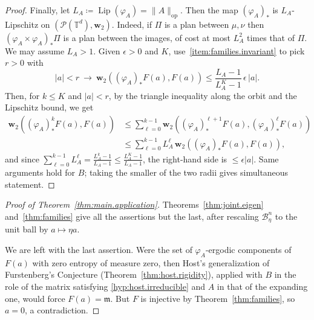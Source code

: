 \documentclass[11pt,reqno]{amsart}
\theoremstyle{plain}
\theoremstyle{definition}
\newcommand{\dw}{\mathbf{w}_2}
\newcommand{\T}{\mathbb{T}}
\newcommand{\Leb}{\mathfrak{m}}
\newcommand{\lto}{\longrightarrow}
\newcommand{\Prob}{\mathcal{P}}
\DeclareMathOperator{\Lip}{Lip}
\begin{document}
\begin{proof}
    Finally, let \( L_A\coloneqq \Lip( \varphi_A )=\lVert A \rVert_{\mathrm{op}} \).
    Then the map \( ( \varphi_A )_\ast  \) is \( L_A \)-Lipschitz on \( (\Prob(\T^d),\dw) \).
    Indeed, if \( \Pi \) is a plan between \( \mu,\nu \) then \( ( \varphi_A \times  \varphi_A )_\ast \Pi \) is a plan between the images, of cost at most \( L_A^2 \) times that of \( \Pi \).
    We may assume \( L_A>1 \).
    Given \( \epsilon>0 \) and \( K \), use~\ref{item:families.invariant} to pick \( r>0 \) with
    \[
        \lvert a \rvert<r\ \lto \
        \dw\left(( \varphi_A )_\ast F(a),F(a)\right)\le\frac{L_A-1}{L_A^{K}-1}\,\epsilon\,\lvert a \rvert .
    \]
    Then, for \( k\le K \) and \( \lvert a \rvert<r \), by the triangle inequality along the orbit and the Lipschitz bound, we get
    \[
        \begin{split}
            \dw\left(( \varphi_A )^k_\ast F(a),F(a)\right) & \le\sum_{\ell=0}^{k-1}\dw\left(( \varphi_A )^{\ell+1}_\ast F(a),( \varphi_A )^{\ell}_\ast F(a)\right) \\
                                                        & \le\sum_{\ell=0}^{k-1}L_A^{\ell}\,\dw\left(( \varphi_A )_\ast F(a),F(a)\right),
        \end{split}
    \]
    and since \(\sum_{\ell=0}^{k-1}L_A^{\ell}=\frac{L_A^{k}-1}{L_A-1} \le\frac{L_A^{K}-1}{L_A-1}\), the right-hand side is \( \le\epsilon\lvert a \rvert \).
    Same arguments hold for \( B \); taking the smaller of the two radii gives simultaneous statement.
\end{proof}

\begin{proof}[Proof of Theorem~\ref{thm:main.application}]
    Theorems~\ref{thm:joint.eigen} and~\ref{thm:families} give all the assertions but the last, after rescaling \(\mathcal B^n_\eta\) to the unit ball by \(a\mapsto\eta a\).
    
    We are left with the last assertion. 
    Were the set of \( \varphi_A \)-ergodic components of \( F(a) \) with zero entropy of measure zero, then Host's generalization of Furstenberg's Conjecture (Theorem~\ref{thm:host.rigidity}), applied with \( B \) in the role of the matrix satisfying \ref{hyp:host.irreducible} and \( A \) in that of the expanding one, would force \( F(a)=\Leb \).
    But \( F \) is injective by Theorem~\ref{thm:families}, so \( a=0 \), a contradiction.
\end{proof}
\end{document}
